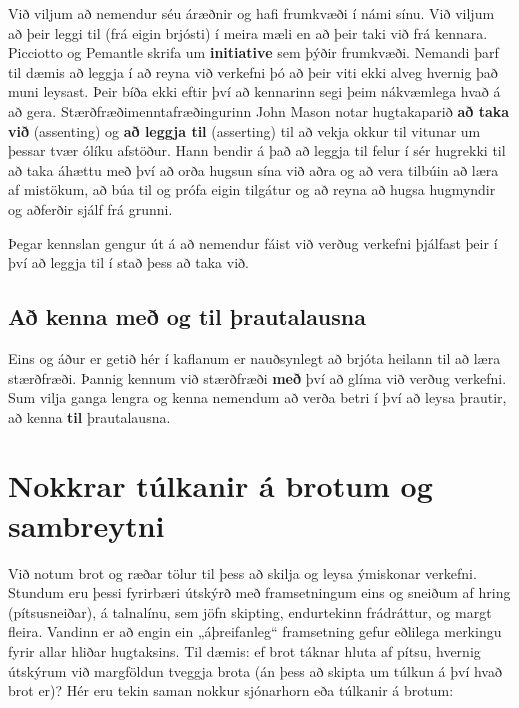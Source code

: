 \documentclass[
  icelandic,
]{book}
\begin{document}
Við viljum að nemendur séu áræðnir og hafi frumkvæði í námi sínu. Við viljum að þeir leggi til (frá eigin brjósti) í meira mæli en að þeir taki við frá kennara. Picciotto og Pemantle skrifa um \textbf{initiative} sem þýðir frumkvæði. Nemandi þarf til dæmis að leggja í að reyna við verkefni þó að þeir viti ekki alveg hvernig það muni leysast. Þeir bíða ekki eftir því að kennarinn segi þeim nákvæmlega hvað á að gera. Stærðfræðimenntafræðingurinn John Mason notar hugtakaparið \textbf{að taka við} (assenting) og \textbf{að leggja til} (asserting) til að vekja okkur til vitunar um þessar tvær ólíku afstöður. Hann bendir á það að leggja til felur í sér hugrekki til að taka áhættu með því að orða hugsun sína við aðra og að vera tilbúin að læra af mistökum, að búa til og prófa eigin tilgátur og að reyna að hugsa hugmyndir og aðferðir sjálf frá grunni.

Þegar kennslan gengur út á að nemendur fáist við verðug verkefni þjálfast þeir í því að leggja til í stað þess að taka við.

\section{Að kenna með og til þrautalausna}\label{auxf0-kenna-meuxf0-og-til-uxferautalausna}

Eins og áður er getið hér í kaflanum er nauðsynlegt að brjóta heilann til að læra stærðfræði. Þannig kennum við stærðfræði \textbf{með} því að glíma við verðug verkefni. Sum vilja ganga lengra og kenna nemendum að verða betri í því að leysa þrautir, að kenna \textbf{til} þrautalausna.

\chapter{Nokkrar túlkanir á brotum og sambreytni}\label{brot-hlutfoll}

Við notum brot og ræðar tölur til þess að skilja og leysa ýmiskonar verkefni. Stundum eru þessi fyrirbæri útskýrð með framsetningum eins og sneiðum af hring (pítsusneiðar), á talnalínu, sem jöfn skipting, endurtekinn frádráttur, og margt fleira. Vandinn er að engin ein „áþreifanleg`` framsetning gefur eðlilega merkingu fyrir allar hliðar hugtaksins. Til dæmis: ef brot táknar hluta af pítsu, hvernig útskýrum við margföldun tveggja brota (án þess að skipta um túlkun á því hvað brot er)?
Hér eru tekin saman nokkur sjónarhorn eða túlkanir á brotum:
\end{document}
